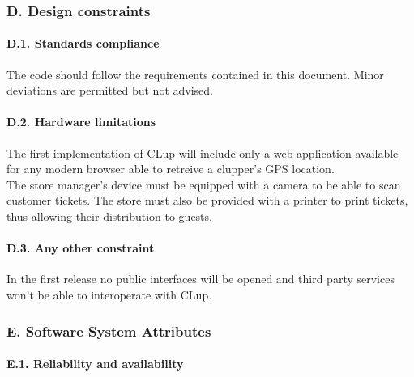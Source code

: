 \documentclass[
]{article}
\begin{document}
\hypertarget{d.-design-constraints}{%
\subsubsection{D. Design constraints}\label{d.-design-constraints}}

\hypertarget{d.1.-standards-compliance}{%
\paragraph{D.1. Standards compliance}\label{d.1.-standards-compliance}}

The code should follow the requirements contained in this document.
Minor deviations are permitted but not advised.

\hypertarget{d.2.-hardware-limitations}{%
\paragraph{D.2. Hardware limitations}\label{d.2.-hardware-limitations}}

The first implementation of CLup will include only a web application
available for any modern browser able to retreive a clupper's GPS
location.\\
The store manager's device must be equipped with a camera to be able to
scan customer tickets. The store must also be provided with a printer to
print tickets, thus allowing their distribution to guests.

\hypertarget{d.3.-any-other-constraint}{%
\paragraph{D.3. Any other constraint}\label{d.3.-any-other-constraint}}

In the first release no public interfaces will be opened and third party
services won't be able to interoperate with CLup.

\hypertarget{e.-software-system-attributes}{%
\subsubsection{E. Software System
Attributes}\label{e.-software-system-attributes}}

\hypertarget{e.1.-reliability-and-availability}{%
\paragraph{E.1. Reliability and
availability}\label{e.1.-reliability-and-availability}}
\end{document}
